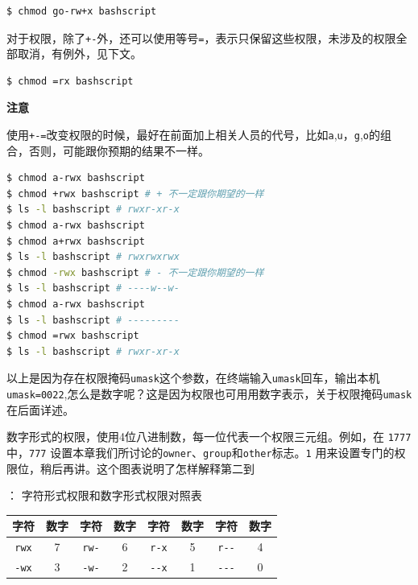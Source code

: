 \documentclass[doctor,openright,twoside]{sjtuthesis}
\newcommand{\passthrough}[1]{#1}
\theoremstyle{plain}
\theoremstyle{definition}
\theoremstyle{remark}
\theoremstyle{ocrenumbox}
\theoremstyle{plain}
\begin{document}
\begin{lstlisting}[language=bash]
$ chmod go-rw+x bashscript
\end{lstlisting}

对于权限，除了\passthrough{\lstinline!+-!}外，还可以使用等号\passthrough{\lstinline!=!}，表示只保留这些权限，未涉及的权限全部取消，有例外，见下文。

\begin{lstlisting}[language=bash]
$ chmod =rx bashscript
\end{lstlisting}

\textbf{注意}

使用\passthrough{\lstinline!+-=!}改变权限的时候，最好在前面加上相关人员的代号，比如\passthrough{\lstinline!a!},\passthrough{\lstinline!u!}，\passthrough{\lstinline!g!},\passthrough{\lstinline!o!}的组合，否则，可能跟你预期的结果不一样。

\begin{lstlisting}[language=bash]
$ chmod a-rwx bashscript
$ chmod +rwx bashscript # + 不一定跟你期望的一样
$ ls -l bashscript # rwxr-xr-x
$ chmod a-rwx bashscript
$ chmod a+rwx bashscript
$ ls -l bashscript # rwxrwxrwx
$ chmod -rwx bashscript # - 不一定跟你期望的一样
$ ls -l bashscript # ----w--w-
$ chmod a-rwx bashscript
$ ls -l bashscript # ---------
$ chmod =rwx bashscript
$ ls -l bashscript # rwxr-xr-x
\end{lstlisting}

以上是因为存在权限掩码\passthrough{\lstinline!umask!}这个参数，在终端输入\passthrough{\lstinline!umask!}回车，输出本机\passthrough{\lstinline!umask=0022!},怎么是数字呢？这是因为权限也可用用数字表示，关于权限掩码\passthrough{\lstinline!umask!}在后面详述。

数字形式的权限，使用4位八进制数，每一位代表一个权限三元组。例如，在 \passthrough{\lstinline!1777!} 中，\passthrough{\lstinline!777!} 设置本章我们所讨论的\passthrough{\lstinline!owner!}、\passthrough{\lstinline!group!}和\passthrough{\lstinline!other!}标志。\passthrough{\lstinline!1!} 用来设置专门的权限位，稍后再讲。这个图表说明了怎样解释第二到

： 字符形式权限和数字形式权限对照表

\begin{longtable}[]{@{}cccccccc@{}}
\toprule
\textbf{字符} & \textbf{数字} & \textbf{字符} & \textbf{数字} & \textbf{字符} & \textbf{数字} & \textbf{字符} & \textbf{数字}\tabularnewline
\midrule
\endhead
\passthrough{\lstinline!rwx!} & 7 & \passthrough{\lstinline!rw-!} & 6 & \passthrough{\lstinline!r-x!} & 5 & \passthrough{\lstinline!r--!} & 4\tabularnewline
\passthrough{\lstinline!-wx!} & 3 & \passthrough{\lstinline!-w-!} & 2 & \passthrough{\lstinline!--x!} & 1 & \passthrough{\lstinline!---!} & 0\tabularnewline
\bottomrule
\end{longtable}
\end{document}
